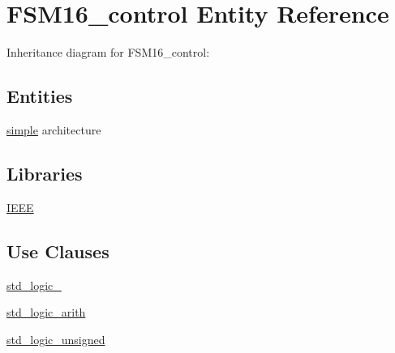 \hypertarget{class_f_s_m16__control}{}\section{F\+S\+M16\+\_\+control Entity Reference}
\label{class_f_s_m16__control}


Inheritance diagram for F\+S\+M16\+\_\+control\+:
\subsection*{Entities}
\begin{DoxyCompactItemize}
\item 
\hyperlink{class_f_s_m16__control_1_1simple}{simple} architecture
\end{DoxyCompactItemize}
\subsection*{Libraries}
 \begin{DoxyCompactItemize}
\item 
\hyperlink{class_f_s_m16__control_ae4f03c286607f3181e16b9aa12d0c6d4}{I\+E\+E\+E} 
\end{DoxyCompactItemize}
\subsection*{Use Clauses}
 \begin{DoxyCompactItemize}
\item 
\hyperlink{class_f_s_m16__control_acd03516902501cd1c7296a98e22c6fcb}{std\+\_\+logic\+\_}   
\item 
\hyperlink{class_f_s_m16__control_a0f5ecc6613f63d07f7963a97b1b26095}{std\+\_\+logic\+\_\+arith}   
\item 
\hyperlink{class_f_s_m16__control_a598da929e807d58939b47499e8bc9fa8}{std\+\_\+logic\+\_\+unsigned}   
\end{DoxyCompactItemize}
